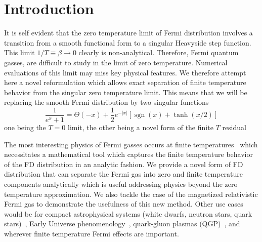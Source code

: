 \documentclass[sn-mathphys,Numbered]{sn-jnl}
\newcommand{\rsec}[1]{Sec.~{\ref{#1}}}
\DeclareMathOperator{\sgn}{sgn}
\begin{document}

\maketitle

\section{Introduction}
\label{sec1}
It is self evident that the  zero temperature limit of Fermi distribution involves a transition from a smooth functional form to a singular Heavyside step function. This limit  $1/T\equiv \beta \to 0$ clearly is non-analytical.  Therefore,   Fermi quantum gasses, are difficult to study in the limit of zero temperature. Numerical evaluations of this limit may miss key physical features.  We therefore attempt here a novel reformulation which allows exact separation of finite temperature behavior from the singular zero temperature limit. This means that we will be replacing the smooth Fermi distribution by two singular functions
$$
\boxed{\frac{1}{e^{x} +1}=\Theta(-x)+\frac{1}{2}e^{-|x|}\left[\sgn(x)+\tanh(x/2)\right]}
$$
one being the $T=0$ limit,  the other being a novel form of the finite $T$ residual


The most interesting physics of Fermi gasses occurs at finite temperatures~\cite{Elze:1980er} which necessitates a mathematical tool which captures the finite temperature behavior of the FD distribution in an analytic fashion. We provide a novel form of FD distribution that can separate the Fermi gas into zero and finite temperature components analytically which is useful addressing physics beyond the zero temperature approximation. We also tackle the case of the magnetized relativistic Fermi gas to demonstrate the usefulness of this new method. Other use cases would be for compact astrophysical systems (white dwarfs, neutron stars, quark stars)~\cite{Kaspi:2017fwg,Ferrer:2019xlr,Ferrer:2023pgq}, Early Universe phenomenology~\cite{Rafelski:2021aey,Rafelski:2023emw,Grayson:2023flr,Steinmetz:2023nsc}, quark-gluon plasmas (QGP)~\cite{Letessier:2002ony,Rafelski:2020ajx,Yang:2021bko}, and wherever finite temperature Fermi effects are important.

\end{document}
